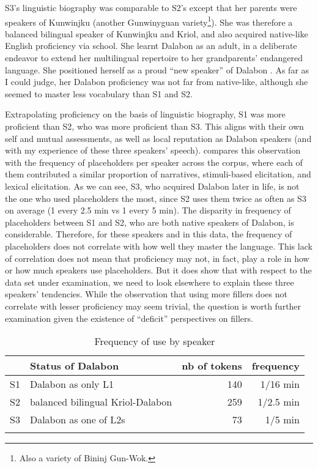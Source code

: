 \documentclass[output=paper]{langscibook}
\begin{document}
S3’s linguistic biography was comparable to S2’s except that her parents were speakers of Kunwinjku (another Gunwinyguan variety\footnote{Also a variety of Bininj Gun-Wok.}). She was therefore a balanced bilingual speaker of Kunwinjku and Kriol, and also acquired native-like English proficiency via school. She learnt Dalabon as an adult, in a deliberate endeavor to extend her multilingual repertoire to her grandparents’ endangered language. She positioned herself as a proud “new speaker” of Dalabon \citep{Budrikis2021}. As far as I could judge, her Dalabon proficiency was not far from native-like, although she seemed to master less vocabulary than S1 and S2. 

Extrapolating proficiency on the basis of linguistic biography, S1 was more proficient than S2, who was more proficient than S3. This aligns with their own self and mutual assessments, as well as local reputation as Dalabon speakers (and with my experience of these three speakers’ speech).  compares this observation with the frequency of placeholders per speaker across the corpus, where each of them contributed a similar proportion of narratives, stimuli-based elicitation, and lexical elicitation. As we can see, S3, who acquired Dalabon later in life, is not the one who used placeholders the most, since S2 uses them twice as often as S3 on average (1 every 2.5 min vs 1 every 5 min). The disparity in frequency of placeholders between S1 and S2, who are both native speakers of Dalabon, is considerable. Therefore, for these speakers and in this data, the frequency of placeholders does not correlate with how well they master the language. This lack of correlation does not mean that proficiency may not, in fact, play a role in how or how much speakers use placeholders. But it does show that with respect to the data set under examination, we need to look elsewhere to explain these three speakers’ tendencies. While the observation that using more fillers does not correlate with lesser proficiency may seem trivial, the question is worth further examination given the existence of “deficit” perspectives on fillers.

\begin{table}
\begin{tabular}{llrr}
\lsptoprule
 & Status of Dalabon & nb of tokens & frequency\\
\midrule
S1 & Dalabon as only L1 & 140 & 1/16 min\\
S2 & balanced bilingual Kriol-Dalabon & 259 & 1/2.5 min\\
S3 & Dalabon as one of L2s & 73 & 1/5 min\\
\lspbottomrule
\end{tabular}
\caption{\label{tab:ponsonnet:1}Frequency of use by speaker}
\end{table}
\end{document}
